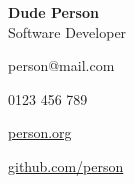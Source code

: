 \begin{multicols}{2}
\begin{flushright}
    {\Huge \bfseries Dude Person}\\
	Software Developer

	\columnbreak
\end{flushright}
\par

\icemail \large{person@mail.com}

\icphone \large{0123 456 789}

\icwebsite \large{\href{https://person.org}{person.org}}\

\icgithub \large{\href{https://github.com/person}{github.com/person}}

\end{multicols}
